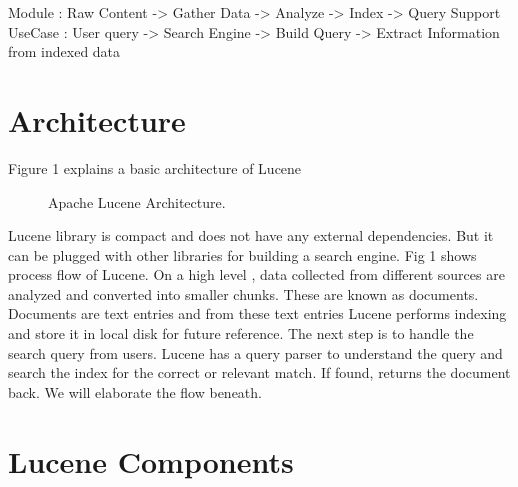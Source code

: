 \documentclass[9pt,twocolumn,twoside]{../../styles/osajnl}
\begin{document}
Module  : Raw Content -> Gather Data -> Analyze -> Index ->  Query Support 
UseCase : User query -> Search Engine -> Build Query -> Extract Information from indexed data

\section{Architecture}
Figure 1 explains a basic architecture of Lucene

\begin{figure}[htbp]
\centering
{}
\caption{Apache Lucene Architecture.}
\label{fig:lucene-data-flow}
\end{figure}

Lucene library is compact and does not have any external dependencies. But it can be plugged with other libraries for building a search engine. Fig 1\cite{lucene-book} shows process flow of Lucene. On a high level , data collected from different sources are analyzed and converted into smaller chunks. These are known as documents. Documents are text entries and from these text entries Lucene performs indexing and store it in local disk for future reference. The next step is to handle the search query from users. Lucene has a query parser to understand the query and search the index for the correct or relevant match. If found, returns the document back. We will elaborate the flow beneath.

\section{Lucene Components}
\end{document}
